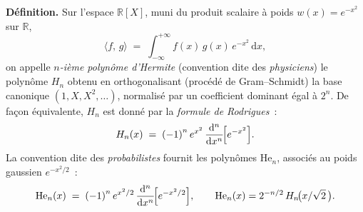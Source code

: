 

\newcommand{\He}{\mathrm{He}}
\newcommand{\Hen}{\mathrm{He}_n}
\newcommand{\psH}[2]{\langle #1,\,#2\rangle}


\begin{tcolorbox}[thmbox]
  \textbf{Définition.}\enspace{}
  Sur l'espace $\mathbb{R}[X]$, muni du produit scalaire à poids
  $w(x)=e^{-x^2}$ sur $\mathbb{R}$,
  \[
    \psH{f}{g} \;=\; \int_{-\infty}^{+\infty} f(x)\,g(x)\,e^{-x^2}\,\mathrm{d}x,
  \]
  on appelle \emph{$n$-ième polynôme d'Hermite} (convention dite des
  \emph{physiciens}) le polynôme $H_n$ obtenu en orthogonalisant
  (procédé de Gram--Schmidt) la base canonique $(1,X,X^2,\ldots)$,
  normalisé par un coefficient dominant égal à $2^n$. De façon
  équivalente, $H_n$ est donné par la
  \emph{formule de Rodrigues}~:
  \[
    H_n(x) \;=\; {(-1)}^n\,e^{x^2}\,
    \frac{\mathrm{d}^n}{\mathrm{d}x^n}\!\Bigl[e^{-x^2}\Bigr].
  \]
  La convention dite des \emph{probabilistes} fournit les polynômes
  $\Hen$, associés au poids gaussien $e^{-x^2/2}$~:
  \[
    \Hen(x) \;=\; {(-1)}^n\,e^{x^2/2}\,
    \frac{\mathrm{d}^n}{\mathrm{d}x^n}\!\Bigl[e^{-x^2/2}\Bigr],
    \qquad \Hen(x) = 2^{-n/2}\,H_n\!\bigl(x/\sqrt{2}\,\bigr).
  \]


\end{tcolorbox}
